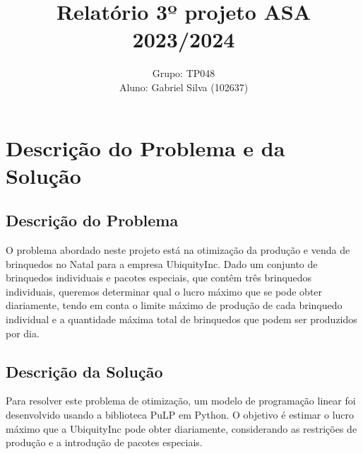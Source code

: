 \documentclass[12pt]{article}
\title{Relatório 3º projeto ASA 2023/2024}
\author{Grupo: TP048 \\ Aluno: Gabriel Silva (102637)}
\date{}
\begin{document}
\maketitle

\section{Descrição do Problema e da Solução}

\subsection{Descrição do Problema}
O problema abordado neste projeto está na otimização da produção e venda de brinquedos no Natal para a empresa UbiquityInc. Dado um conjunto de brinquedos individuais e pacotes especiais, que contêm três brinquedos individuais, queremos determinar qual o lucro máximo que se pode obter diariamente, tendo em conta o limite máximo de produção de cada brinquedo individual e a quantidade máxima total de brinquedos que podem ser produzidos por dia.

\subsection{Descrição da Solução}
Para resolver este problema de otimização, um modelo de programação linear foi desenvolvido usando a biblioteca PuLP em Python. O objetivo é estimar o lucro máximo que a UbiquityInc pode obter diariamente, considerando as restrições de produção e a introdução de pacotes especiais.
\end{document}
